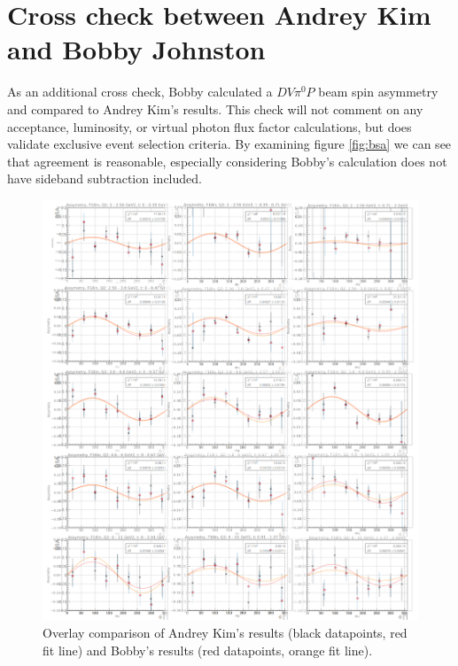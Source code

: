 \section{Cross check between Andrey Kim and Bobby Johnston}

As an additional cross check, Bobby calculated a $DV\pi^0P$ beam spin asymmetry and compared to Andrey Kim's results. This check will not comment on any acceptance, luminosity, or virtual photon flux factor calculations, but does validate exclusive event selection criteria. By examining figure \ref{fig:bsa} we can see that agreement is reasonable, especially considering Bobby's calculation does not have sideband subtraction included.

\begin{figure}[hbt]
	\centering
	\includegraphics[width=0.75\linewidth]{BSA.png}
	
	
	\caption{Overlay comparison of Andrey Kim's results (black datapoints, red fit line) and Bobby's results (red datapoints, orange fit line).}
	\label{fig:good}
\end{figure}


